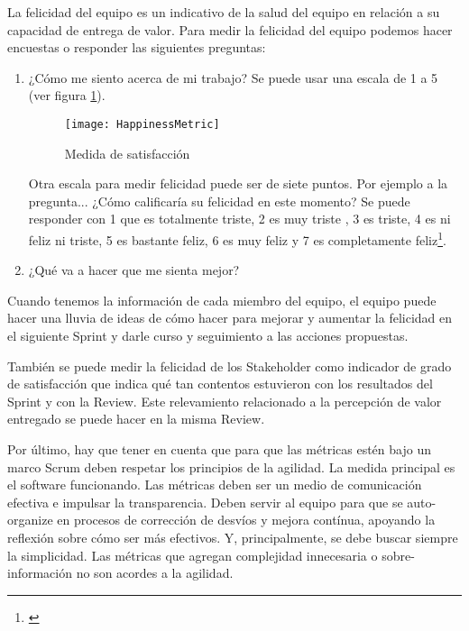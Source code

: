 \begin{enumerate}
{La felicidad del equipo es un indicativo de la salud del equipo en relación a su capacidad de entrega de valor. Para medir la felicidad del equipo podemos hacer encuestas o responder las siguientes preguntas:

  \begin{enumerate}
  \item {¿Cómo me siento acerca de mi trabajo? Se puede usar una escala de 1 a 5 (ver figura \ref{fig:HappinessMetric}). 
  
  \begin{figure}[h]
  \centering
  \texttt{[image: HappinessMetric]}
  \caption{Medida de satisfacción}
  \centering
  \label{fig:HappinessMetric} %
\end{figure}

  Otra escala para medir felicidad puede ser de siete puntos. Por ejemplo a la pregunta... ¿Cómo calificaría su felicidad en este momento? Se puede responder con 1 que es totalmente triste, 2 es muy triste , 3 es triste, 4 es ni feliz ni triste, 5 es bastante feliz, 6 es muy feliz y 7 es completamente feliz\footnote{\cite{U-K-University-2014}}.
  }
  
  \item {¿Qué va a hacer que me sienta mejor?}
  \end{enumerate}

Cuando tenemos la información de cada miembro del equipo, el equipo puede hacer una lluvia de ideas de cómo hacer para mejorar y aumentar la felicidad en el siguiente Sprint y darle curso y seguimiento a las acciones propuestas.

También se puede medir la felicidad de los Stakeholder como indicador de grado de satisfacción que indica qué tan contentos estuvieron con los resultados del Sprint y con la Review. Este relevamiento relacionado a la percepción de valor entregado se puede hacer en la misma Review.

}


\end{enumerate}


Por último, hay que tener en cuenta que para que las métricas estén bajo un marco Scrum deben respetar los principios de la agilidad. La medida principal es el software funcionando. Las métricas deben ser un medio de comunicación efectiva e impulsar la transparencia. Deben servir al equipo para que se auto-organize en procesos de corrección de desvíos y mejora contínua, apoyando la reflexión sobre cómo ser más efectivos. Y, principalmente, se debe buscar siempre la simplicidad. Las métricas que agregan complejidad innecesaria o sobre-información no son acordes a la agilidad.
